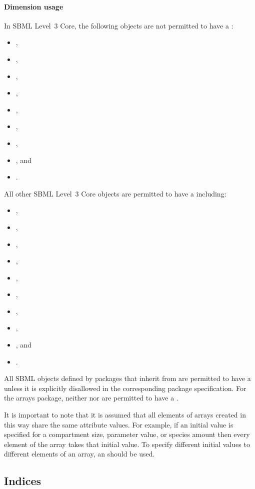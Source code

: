 \paragraph{Dimension usage}
\label{sec:dimensionUsage}

In SBML Level~3 Core, the following objects are not permitted to have a \ListOfDimensions:
\begin{itemize}
\item \Model,
\item \FunctionDefinition,  
\item \Unit,  
\item \UnitDefinition,  
\item \KineticLaw,  
\item \LocalParameter,  
\item \Trigger,  
\item \Priority, and 
\item \Delay.
\end{itemize}
All other SBML Level~3 Core objects are permitted to have a \ListOfDimensions including:
\begin{itemize}
\item \Compartment,
\item \Species,
\item \Parameter,
\item \InitialAssignment,
\item \Rule,
\item \Constraint,
\item \Reaction,
\item \SpeciesReference,
\item \Event, and
\item \EventAssignment.    
\end{itemize}
All SBML objects defined by packages that inherit from \SBase are permitted to have a \ListOfDimensions unless it is explicitly disallowed in the corresponding package specification.   For the arrays package, neither \Dimension nor \Index are permitted to have a \ListOfDimensions.

It is important to note that it is assumed that all elements of arrays created in this way share the same attribute values.   For example, if an initial value is specified for a compartment size, parameter value, or species amount then every element of the array takes that initial value.   To specify different initial values to different elements of an array, an \InitialAssignment should be used.  

\subsection{Indices}
\label{sec:index}

